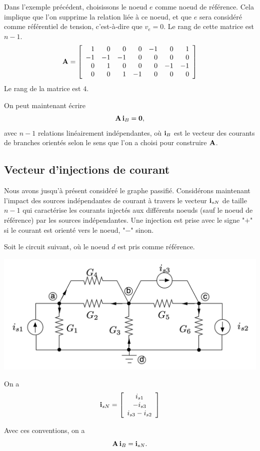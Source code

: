 \begin{testexample}
Dans l'exemple précédent, choisissons le noeud $e$ comme noeud de référence. Cela implique que l'on supprime la relation liée à ce noeud, et que $e$ sera considéré comme référentiel de tension, c'est-à-dire que $v_e = 0$. Le rang de cette matrice est $n-1$.
\[ {\bf A} = 
\left[\begin{array}{rrrrrrr}
1 & 0 & 0 & 0 & -1 & 0 & 1\\
-1&-1 & -1& 0 & 0  & 0 & 0\\
0 & 1 & 0 & 0 & 0  &-1 &-1\\
0 & 0 & 1 &-1 & 0 & 0 & 0
\end{array}\right] \]
Le rang de la matrice est $4$.
\end{testexample}
On peut maintenant écrire $${\bf A}\, {\bf i}_B =  {\bf 0},$$
avec $n-1$ relations linéairement indépendantes, où
${\bf i}_B$ est le vecteur des courants de branches orientés selon le sens que l'on a choisi pour construire ${\bf A}$.

\subsection{Vecteur d'injections de courant} Nous avons jusqu'à présent considéré le graphe passifié. Considérons maintenant l'impact des sources indépendantes de courant à travers le vecteur ${\bf i}_{sN}$ de taille $n-1$ qui caractérise les courants injectés aux différents noeuds (sauf le noeud de référence) par les sources indépendantes. Une injection est prise avec le signe "$+$" si le courant est orienté vers le noeud, "$-$" sinon.

\begin{testexample}
Soit le circuit suivant, où le noeud $d$ est pris comme référence.
\begin{center}
\includegraphics[width=0.8\linewidth]{figs/methodes-generales/exemple_iSN}
\end{center}
On a 
\[ {\bf i}_{sN} = 
\left[
\begin{array}{c}
i_{s1}\\
-i_{s3}\\
i_{s3}-i_{s2}
\end{array} \right] \]
\end{testexample}
Avec ces conventions, on a 
$${\bf A}\, {\bf i}_B =  {\bf i}_{sN}.$$


